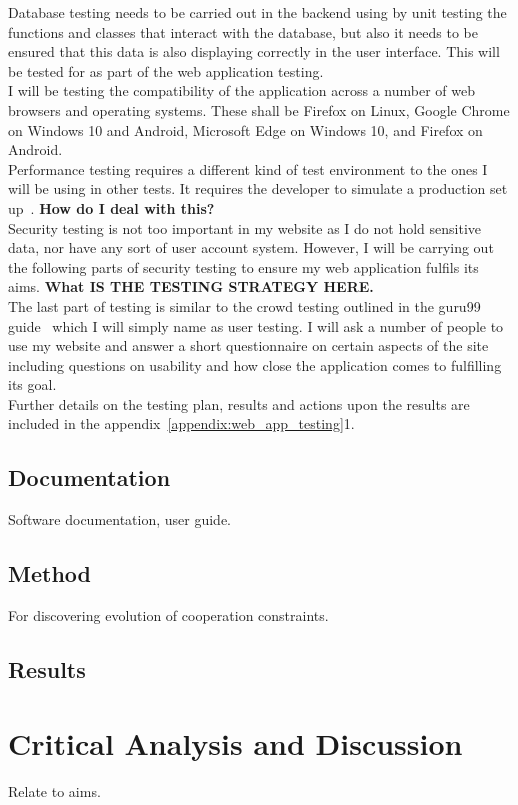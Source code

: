 \documentclass[]{final_report}
\begin{document}
Database testing needs to be carried out in the backend using by unit testing the functions and classes that interact with the database, but also it needs to be ensured that this data is also displaying correctly in the user interface. This will be tested for as part of the web application testing.\\
I will be testing the compatibility of the application across a number of web browsers and operating systems. These shall be Firefox on Linux, Google Chrome on Windows 10 and Android, Microsoft Edge on Windows 10, and Firefox on Android.\\
Performance testing requires a different kind of test environment to the ones I will be using in other tests. It requires the developer to simulate a production set up~\cite{web_app_performance_testing}. \textbf{How do I deal with this?}\\
Security testing is not too important in my website as I do not hold sensitive data, nor have any sort of user account system. However, I will be carrying out the following parts of security testing to ensure my web application fulfils its aims. \textbf{What IS THE TESTING STRATEGY HERE.}\\
The last part of testing is similar to the crowd testing outlined in the guru99 guide~\cite{guru99_testing} which I will simply name as user testing. I will ask a number of people to use my website and answer a short questionnaire on certain aspects of the site including questions on usability and how close the application comes to fulfilling its goal.\\
Further details on the testing plan, results and actions upon the results are included in the appendix~\ref{appendix:web_app_testing}1.


\section{Documentation}
Software documentation, user guide.

\section{Method}
For discovering evolution of cooperation constraints.

\section{Results}


\chapter{Critical Analysis and Discussion}
Relate to aims.
\end{document}
